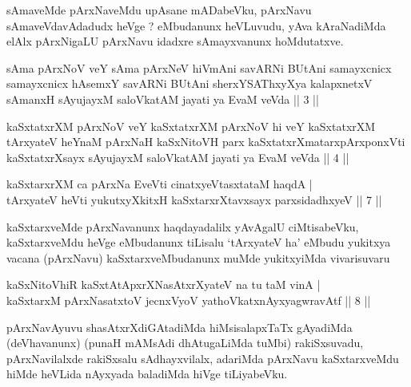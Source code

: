 \begin{artha}
sAmaveMde pArxNaveMdu upAsane mADabeVku, pArxNavu sAmaveVdavAdadudx heVge ? eMbudanunx heVLuvudu, yAva kAraNadiMda elAlx pArxNigaLU pArxNavu idadxre sAmayxvanunx hoMdutatxve.
\end{artha}

\begin{kandikeshl}
sAma pArxNoV veY sAma pArxNeV hiVmAni savARNi BUtAni samayxcnicx samayxcnicx hAsemxY savARNi BUtAni sherxYSAThxyXya kalapxnetxV sAmanxH sAyujayxM saloVkatAM jayati ya EvaM veVda || 3 ||
\end{kandikeshl}

\begin{kandikeshl}
kaSxtatxrXM pArxNoV veY kaSxtatxrXM pArxNoV hi veY kaSxtatxrXM tArxyateV heYnaM pArxNaH kaSxNitoVH parx kaSxtatxrXmatarxpArxponxVti kaSxtatxrXsayx sAyujayxM saloVkatAM jayati ya EvaM veVda || 4 ||
\end{kandikeshl}


\begin{shl}
kaSxtarxrXM ca pArxNa EveVti cinatxyeVtasxtataM haqdA | \\
tArxyateV heVti yukutxyXkitxH kaSxtarxrXtavxsayx parxsidadhxyeV \hfill ||  7 || 
\end{shl}

\begin{artha}
kaSxtarxveMde pArxNavanunx haqdayadalilx yAvAgalU ciMtisabeVku, kaSxtarxveMdu heVge eMbudanunx tiLisalu `tArxyateV ha' eMbudu yukitxya vacana (pArxNavu) kaSxtarxveMbudanunx muMde yukitxyiMda vivarisuvaru \mdash 
\end{artha}

\begin{shl}
kaSxNitoVhiR kaSxtAtApxrXNasAtxrXyateV na tu taM vinA | \\
kaSxtarxM pArxNasatxtoV jecnxVyoV yathoVkatxnAyxyagwravAtf \hfill ||  8 || 
\end{shl}

\begin{artha}
pArxNavAyuvu shasAtxrXdiGAtadiMda hiMsisalapxTaTx gAyadiMda (deVhavanunx) (punaH mAMsAdi dhAtugaLiMda tuMbi) rakiSxsuvadu, pArxNavilalxde rakiSxsalu sAdhayxvilalx, adariMda pArxNavu kaSxtarxveMdu hiMde heVLida nAyxyada baladiMda hiVge tiLiyabeVku.
\end{artha}

